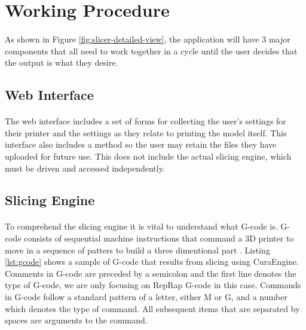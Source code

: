 \section{Working Procedure}
\paragraph{}
As shown in Figure \ref{fig:slicer-detailed-view}, the application will have 3 major components that all need to work together in a cycle until the user decides that the output is what they desire.

\subsection{Web Interface}
\paragraph{}
The web interface includes a set of forms for collecting the user's settings for their printer and the settings as they relate to printing the model itself.
This interface also includes a method so the user may retain the files they have uploaded for future use.
This does not include the actual slicing engine, which must be driven and accessed independently.

\subsection{Slicing Engine}
\paragraph{}
To comprehend the slicing engine it is vital to understand what G-code is.
G-code consists of sequential machine instructions that command a 3D printer to move in a sequence of patters to build a three dimentional part \citep{gcode-2012}.
Listing \ref{lst:gcode} shows a sample of G-code that results from slicing using CuraEngine.
Comments in G-code are preceded by a semicolon and the first line denotes the type of G-code, we are only focusing on RepRap G-code in this case.
Commands in G-code follow a standard pattern of a letter, either M or G, and a number which denotes the type of command.
All subsequent items that are separated by spaces are arguments to the command.

